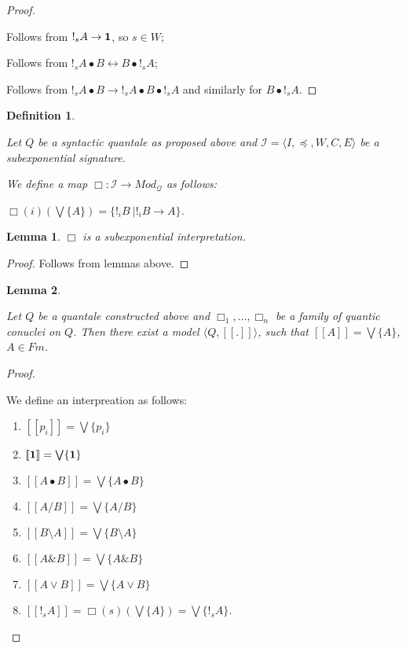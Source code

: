 \documentclass[a4paper]{article}
\theoremstyle{defin}
\newtheorem{defin}{Definition}
\theoremstyle{theorem}
\theoremstyle{prop}
\theoremstyle{lemma}
\newtheorem{lemma}{Lemma}
\theoremstyle{ex}
\theoremstyle{col}
\begin{document}
\begin{proof}
$ $

  \item Follows from $!_s A \rightarrow {\bf 1}$, so $s \in W$;
  \item Follows from $!_s A \bullet B \leftrightarrow B \bullet !_s A$;
  \item Follows from $!_s A \bullet B \rightarrow !_s A \bullet B \bullet !_s A$ and similarly for $B \bullet !_s A$.
\end{proof}

\begin{defin}
$ $

Let $Q$ be a syntactic quantale as proposed above and
$\mathcal{I} = \langle I, \preceq, W, C, E \rangle$ be a subexponential signature.

We define a map $\Box : \mathcal{I} \to Mod_{\mathcal{Q}}$ as follows:

$\Box(i)(\bigvee \{ A \} ) = \{ !_i B \: | !_i B \rightarrow A \}$.
\end{defin}

\begin{lemma} $\Box$ is a subexponential interpretation.
\end{lemma}

\begin{proof}
  Follows from lemmas above.
\end{proof}

\begin{lemma}
$ $

  Let $Q$ be a quantale constructed above and $\Box_1, \dots, \Box_n$ be a family of quantic conuclei on $Q$.
  Then there exist a model $\langle Q, [\![.]\!]\rangle$, such that $[\![A]\!] = \bigvee \{ A \}$, $A \in Fm$.
\end{lemma}

\begin{proof}
$ $

  We define an interpreation as follows:

\begin{enumerate}
  \item $[\![p_i]\!] = \bigvee \{ p_i \}$
  \item $[\![{\bf 1}]\!] = \bigvee \{ {\bf 1} \}$
  \item $[\![A \bullet B]\!] = \bigvee \{ A \bullet B \}$
  \item $[\![A / B]\!] = \bigvee \{ A / B \}$
  \item $[\![B \setminus A]\!] = \bigvee \{ B \setminus A \}$
  \item $[\![A \& B ]\!] = \bigvee \{ A \& B \}$
  \item $[\![A \lor B]\!] = \bigvee \{ A \lor B\}$
  \item $[\![!_s A]\!] = \Box(s) (\bigvee \{ A \}) = \bigvee \{ !_s A \}$.
\end{enumerate}
\end{proof}
\end{document}
